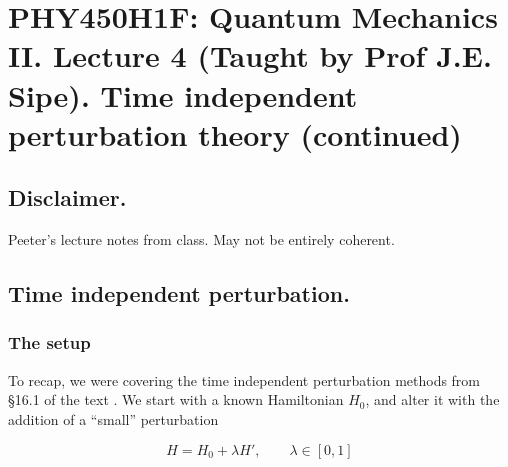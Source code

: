 
%

\chapter{PHY450H1F: Quantum Mechanics II.  Lecture 4 (Taught by Prof J.E. Sipe).  Time independent perturbation theory (continued)}
\label{chap:qmTwoL4}
{}
\date{Sept 21, 2011}

\beginArtWithToc

\section{Disclaimer.}

Peeter's lecture notes from class.  May not be entirely coherent.

\section{Time independent perturbation.}
\subsection{The setup}

To recap, we were covering the time independent perturbation methods from \S 16.1 of the text \cite{desai2009quantum}.  We start with a known Hamiltonian $H_0$, and alter it with the addition of a ``small'' perturbation

\begin{equation}\label{eqn:qmTwoL4:10}
H = H_0 + \lambda H', \qquad \lambda \in [0,1]
\end{equation}


